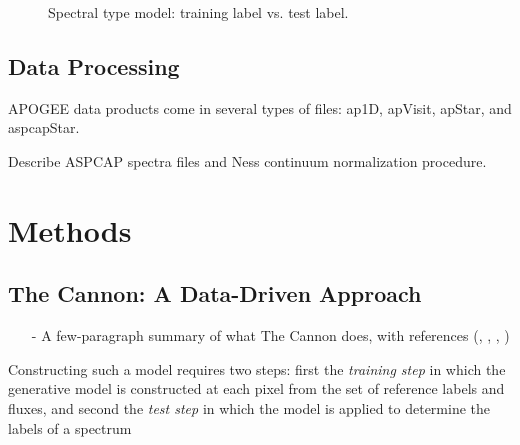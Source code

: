 \documentclass[modern]{aastex62}
\begin{document}
\color{red}{why logg not included as atmospheric parameter?}\color{black}

\begin{figure}[ht]
\caption{Spectral type model: training label vs. test label.} \label{fig:west_selftest} \label{fig:train_dist}
\end{figure}

\subsection{Data Processing}

APOGEE data products come in several types of files: ap1D, apVisit, apStar, and aspcapStar.

Describe ASPCAP spectra files and Ness continuum normalization procedure.


\section{Methods} \label{sec:cannon}

\subsection{The Cannon: A Data-Driven Approach}

\begin{enumerate}
\item[-] A few-paragraph summary of what The Cannon does, with references (\citealt{Ness:2015}, \citealt{Casey:2016}, \citealt{Ho:2017a}, \citealt{Ho:2017b})
\end{enumerate}

Constructing such a model requires two steps: first the \emph{training step} in which the generative model is constructed at each pixel from the set of reference labels and fluxes, and second the \emph{test step} in which the model is applied to determine the labels of a spectrum 

\end{document}
